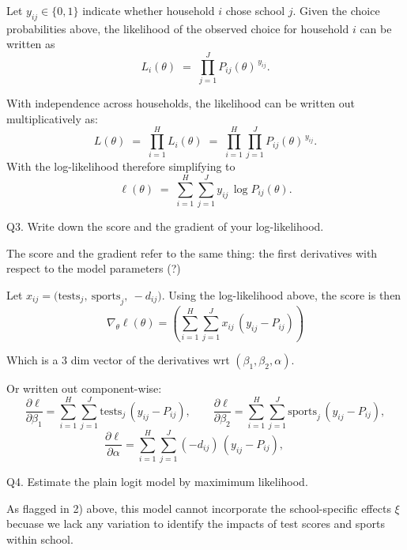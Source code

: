 \documentclass{article}
\begin{document}
Let $y_{ij}\in\{0,1\}$ indicate whether household $i$ chose school $j$.
Given the choice probabilities above, the likelihood of the observed choice for household $i$ can be written as
\[
L_i(\theta) \;=\; \prod_{j=1}^J P_{ij}(\theta)^{\,y_{ij}}.
\]

With independence across households, the likelihood can be written out multiplicatively as:
\[
L(\theta) \;=\; \prod_{i=1}^H L_i(\theta) 
\;=\; \prod_{i=1}^H \prod_{j=1}^J P_{ij}(\theta)^{\,y_{ij}}.
\]
With the log-likelihood therefore simplifying to
\[
\ell(\theta) 
\;=\; \sum_{i=1}^H \sum_{j=1}^J y_{ij}\,\log P_{ij}(\theta).
\]




\begin{tcolorbox}
Q3. Write down the score and the gradient of your log-likelihood.
\end{tcolorbox}

The score and the gradient refer to the same thing: the first derivatives with respect to the model parameters (?)

\vspace{5mm}

Let $x_{ij} = \big(\text{tests}_j,\ \text{sports}_j,\ -d_{ij}\big)$. Using the log-likelihood above, the score is then
\[
\nabla_\theta \ell(\theta)
=
\left(
\sum_{i=1}^H \sum_{j=1}^J x_{ij}\,(y_{ij}-P_{ij})
\right)
\]

Which is a 3 dim vector of the derivatives wrt $(\beta_1,\beta_2,\alpha)$.

Or written out component-wise:
\[
\frac{\partial \ell}{\partial \beta_1}
=\sum_{i=1}^H\sum_{j=1}^J \text{tests}_j\,(y_{ij}-P_{ij}), 
\qquad
\frac{\partial \ell}{\partial \beta_2}
=\sum_{i=1}^H\sum_{j=1}^J \text{sports}_j\,(y_{ij}-P_{ij}),
\]
\[
\frac{\partial \ell}{\partial \alpha}
=\sum_{i=1}^H\sum_{j=1}^J (-d_{ij})\,(y_{ij}-P_{ij}),
\qquad
\]

\begin{tcolorbox}
Q4. Estimate the plain logit model by maximimum likelihood.
\end{tcolorbox}

As flagged in 2) above, this model cannot incorporate the school-specific effects $\xi$ becuase we lack any variation to identify the impacts of test scores and sports within school.

\begin{table}[H]
\centering
{}
\caption{Estimation results for logit models.}
\end{table}
\end{document}

